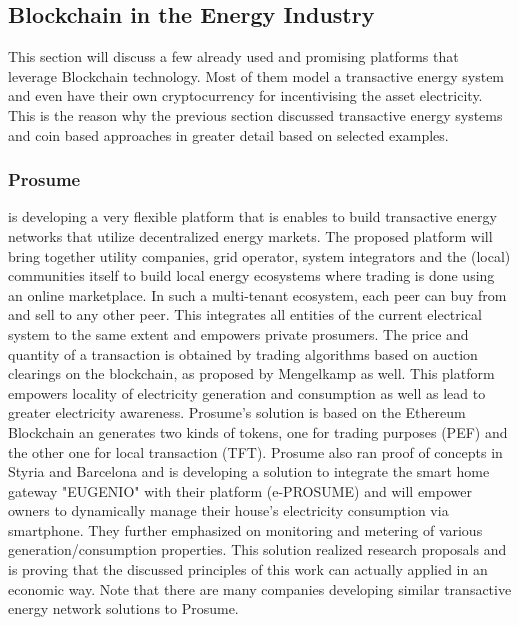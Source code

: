 \documentclass[runningheads]{llncs}
\begin{document}
\subsection{Blockchain in the Energy Industry}
This section will discuss a few already used and promising platforms that leverage Blockchain technology. Most of them model a transactive energy system and even have their own cryptocurrency for incentivising the asset electricity. This is the reason why the previous section discussed transactive energy systems and coin based approaches in greater detail based on selected examples.

\subsubsection{Prosume} is developing a very flexible platform that is enables to build transactive energy networks that utilize decentralized energy markets. The proposed platform will bring together utility companies, grid operator, system integrators and the (local) communities itself to build local energy ecosystems where trading is done using an online marketplace. In such a multi-tenant ecosystem, each peer can buy from and sell to any other peer. This integrates all entities of the current electrical system to the same extent and empowers private prosumers. The price and quantity of a transaction is obtained by trading algorithms based on auction clearings on the blockchain, as proposed by Mengelkamp \cite{mengelkamp_lem} as well. \newline
This platform empowers locality of electricity generation and consumption as well as lead to greater electricity awareness. Prosume's solution is based on the Ethereum Blockchain an generates two kinds of tokens, one for trading purposes (PEF) and the other one for local transaction (TFT). \cite{prosume_wp}
Prosume also ran proof of concepts in Styria and Barcelona and is developing a solution to integrate the smart home gateway "EUGENIO" with their platform (e-PROSUME) and will empower owners to dynamically manage their house's electricity consumption via smartphone. They further emphasized on monitoring and metering of various generation/consumption properties. \cite{prosume_briefing}
This solution realized research proposals and is proving that the discussed principles of this work can actually applied in an economic way. Note that there are many companies developing similar transactive energy network solutions to Prosume.
\end{document}
